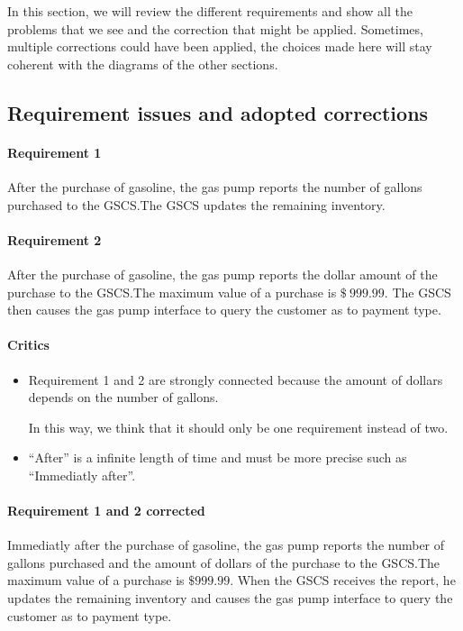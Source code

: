 In this section, we will review the different requirements and show all the
problems that we see and the correction that might be applied. Sometimes,
multiple corrections could have been applied, the choices made here will
stay coherent with the diagrams of the other sections.

\subsection{Requirement issues and adopted corrections}

\paragraph{Requirement 1} After the purchase of gasoline, the gas pump
reports the number of gallons purchased to the GSCS.\@ The GSCS updates the
remaining inventory.

\paragraph{Requirement 2} After the purchase of gasoline, the gas pump
reports the dollar amount of the purchase to the GSCS.\@ The maximum value of
a purchase is $\$~999.99$. The GSCS then causes the gas pump interface to
query the customer as to payment type.

\begin{framed}
    \paragraph{Critics}
    \begin{itemize}
        \item Requirement 1 and 2 are strongly connected because the
            amount of dollars depends on the number of gallons.

            In this way, we think that it should only be one
            requirement instead of two.

        \item \enquote{After} is a infinite length of time and must be more
            precise such as \enquote{Immediatly after}.
    \end{itemize}

    \paragraph{Requirement 1 and 2 corrected} Immediatly after the purchase of
    gasoline, the gas pump reports the number of gallons purchased and the
    amount of dollars of the purchase to the GSCS.\@ The maximum value of
    a purchase is $\$999.99$.
    When the GSCS receives the report, he updates the remaining
    inventory and causes the gas pump interface to query the customer as to
    payment type.
\end{framed}

